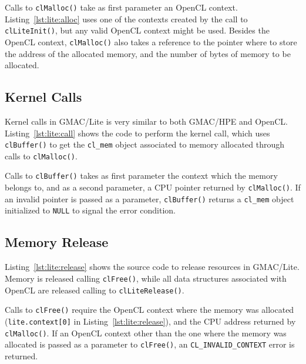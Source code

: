 

Calls to \texttt{clMalloc()} take as first parameter an OpenCL context.  
Listing~\ref{lst:lite:alloc} uses one of the contexts created by the call to \texttt{clLiteInit()}, 
but any valid OpenCL context might be used. Besides the OpenCL context, \texttt{clMalloc()} also 
takes a reference to the pointer where to store the address of the allocated memory, and the number 
of bytes of memory to be allocated.

\subsection{Kernel Calls}
Kernel calls in GMAC\slash Lite is very similar to both GMAC\slash HPE and OpenCL\@.  
Listing~\ref{lst:lite:call} shows the code to perform the kernel call, which uses 
\texttt{clBuffer()} to get the \texttt{cl\_mem} object associated to memory allocated through calls 
to \texttt{clMalloc()}.



Calls to \texttt{clBuffer()} takes as first parameter the context which the memory belongs to, and 
as a second parameter, a CPU pointer returned by \texttt{clMalloc()}.  If an invalid pointer is 
passed as a parameter, \texttt{clBuffer()} returns a \texttt{cl\_mem} object initialized to 
\texttt{NULL} to signal the error condition.

\subsection{Memory Release}
Listing~\ref{lst:lite:release} shows the source code to release resources in GMAC\slash Lite. Memory 
is released calling \texttt{clFree()}, while all data structures associated with OpenCL are released 
calling to \texttt{clLiteRelease()}.



Calls to \texttt{clFree()} require the OpenCL context where the memory was allocated 
(\texttt{lite.context[0]} in Listing~\ref{lst:lite:release}), and the CPU address returned by 
\texttt{clMalloc()}. If an OpenCL context other than the one where the memory was allocated is 
passed as a parameter to \texttt{clFree()}, an \texttt{CL\_INVALID\_CONTEXT} error is returned.

